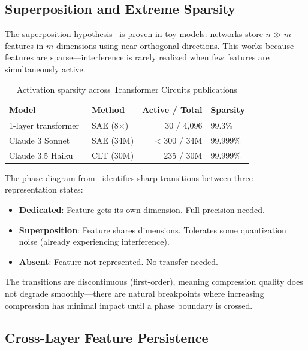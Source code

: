 \documentclass[11pt,letterpaper]{article}
\begin{document}
\subsection{Superposition and Extreme Sparsity}

The superposition hypothesis~\cite{elhage2022superposition} is proven in toy models: networks store $n \gg m$ features in $m$ dimensions using near-orthogonal directions. This works because features are sparse---interference is rarely realized when few features are simultaneously active.

\begin{table}[htbp]
\centering
\caption{Activation sparsity across Transformer Circuits publications}
\label{tab:sparsity}
\begin{tabular}{@{}llrl@{}}
\toprule
\textbf{Model} & \textbf{Method} & \textbf{Active / Total} & \textbf{Sparsity} \\
\midrule
1-layer transformer~\cite{bricken2023monosemantic} & SAE (8$\times$) & 30 / 4,096 & 99.3\% \\
Claude 3 Sonnet~\cite{templeton2024scaling} & SAE (34M) & $<$300 / 34M & 99.999\% \\
Claude 3.5 Haiku~\cite{lindsey2025biology} & CLT (30M) & 235 / 30M & 99.999\% \\
\bottomrule
\end{tabular}
\end{table}

The phase diagram from~\cite{elhage2022superposition} identifies sharp transitions between three representation states:
\begin{itemize}
    \item \textbf{Dedicated}: Feature gets its own dimension. Full precision needed.
    \item \textbf{Superposition}: Feature shares dimensions. Tolerates some quantization noise (already experiencing interference).
    \item \textbf{Absent}: Feature not represented. No transfer needed.
\end{itemize}

The transitions are discontinuous (first-order), meaning compression quality does not degrade smoothly---there are natural breakpoints where increasing compression has minimal impact until a phase boundary is crossed.

\subsection{Cross-Layer Feature Persistence}
\end{document}

